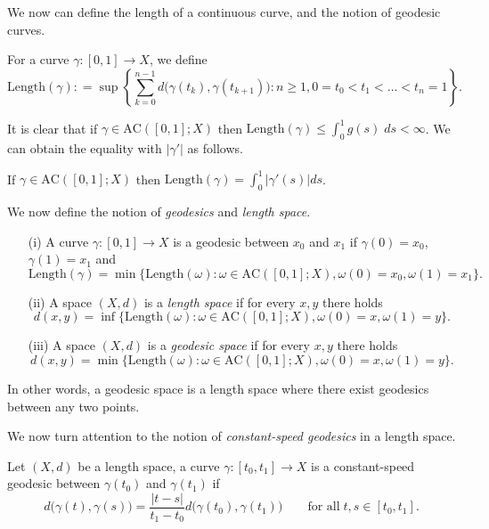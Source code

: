 We now can define the length of a continuous curve, and the notion of geodesic curves.

\begin{defn}[Length] For a curve $\gamma:[0,1]\to X$, we define
\begin{equation*}
    \mathrm{Length}(\gamma): = \sup \left\lbrace \sum_{k=0}^{n-1}d\big(\gamma(t_k), \gamma(t_{k+1})\big): n\geq 1, 0=t_0<t_1<\ldots < t_n = 1 \right\rbrace.
\end{equation*}
\end{defn}

It is clear that if $\gamma\in \mathrm{AC}([0,1];X)$ then $\mathrm{Length}(\gamma) \leq \int_0^1 g(s)\;ds < \infty$. We can obtain the equality with $|\gamma'|$ as follows.

\begin{thm} If $\gamma\in \mathrm{AC}([0,1];X)$ then $\mathrm{Length}(\gamma) = \int_0^1 |\gamma'(s)|ds$.
\end{thm}

We now define the notion of \emph{geodesics} and \emph{length space}.
\begin{defn} \quad 
\begin{itemize}
    \item[(i)] A curve $\gamma:[0,1]\to X$ is a geodesic between $x_0$ and $x_1$ if $\gamma(0) = x_0$, $\gamma(1) = x_1$ and 
    \begin{equation*}
        \mathrm{Length}(\gamma) = \min \big\lbrace \mathrm{Length}(\omega): \omega\in \mathrm{AC}([0,1];X), \omega(0)=x_0, \omega(1)=x_1\big\rbrace.
    \end{equation*}
    \item[(ii)] A space $(X,d)$ is a \emph{length space} if for every $x,y$ there holds
    \begin{equation*}
        d(x,y) = \inf \big\lbrace\mathrm{Length}(\omega): \omega\in \mathrm{AC}([0,1];X), \omega(0)=x, \omega(1)=y \big\rbrace.
    \end{equation*}
    \item[(iii)] A space $(X,d)$  is a \emph{geodesic space} if for every $x,y$ there holds
    \begin{equation*}
        d(x,y) = \min \big\lbrace\mathrm{Length}(\omega): \omega\in \mathrm{AC}([0,1];X), \omega(0)=x, \omega(1)=y \big\rbrace.
    \end{equation*}
\end{itemize}
In other words, a geodesic space is a length space where there exist geodesics between any two points.
\end{defn}

We now turn attention to the notion of \emph{constant-speed geodesics} in a length space.

\begin{defn} Let $(X,d)$ be a length space, a curve $\gamma:[t_0,t_1]\to X$ is a constant-speed geodesic between $\gamma(t_0)$ and $\gamma(t_1)$ if 
\begin{equation*}
    d\big(\gamma(t),\gamma(s)\big) = \frac{|t-s|}{t_1-t_0} d\big(\gamma(t_0),\gamma(t_1)\big) \qquad\text{for all}\; t,s \in [t_0,t_1].
\end{equation*}

\end{defn}
